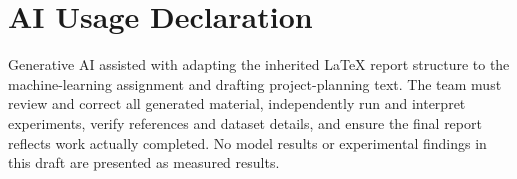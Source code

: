 \section{AI Usage Declaration}
Generative AI assisted with adapting the inherited LaTeX report structure to the machine-learning assignment and drafting project-planning text. The team must review and correct all generated material, independently run and interpret experiments, verify references and dataset details, and ensure the final report reflects work actually completed. No model results or experimental findings in this draft are presented as measured results.
